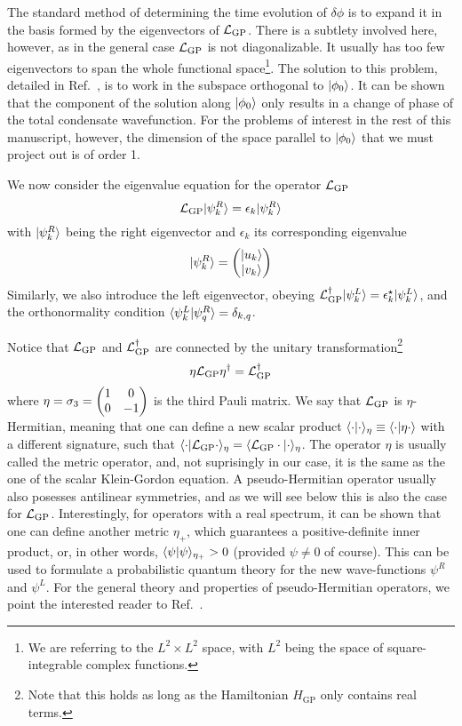 The standard method of determining the time evolution of $\delta\phi$
is to expand it in the basis formed by the eigenvectors of
$\mathcal{L}_{\text{GP}}$. There is a subtlety involved here, however, as in
the general case $\mathcal{L}_{\text{GP}}$ is not diagonalizable. It usually
has too few eigenvectors to span the whole functional
space\footnote{We are referring to the $L^2 \times L^2$ space, with
  $L^2$ being the space of square-integrable complex functions.}.
The solution to this problem, detailed in Ref.~\cite{Castin_1998},
is to work in the subspace orthogonal to $\vert \phi_0 \rangle$. It can be
shown that the component of the solution along $\vert \phi_0 \rangle$ only
results in a change of phase of the total condensate wavefunction. For
the problems of interest in the rest of this manuscript, however, the
dimension of the space parallel to $\vert \phi_0 \rangle$ that we must project
out is of order 1.

We now consider the eigenvalue equation for the operator $\mathcal{L}_{\text{GP}}$
%
\begin{equation}\label{eq:L-eigen}
  \mathcal{L}_{\text{GP}} \vert \psi_k^R \rangle = \epsilon_k \vert \psi_k^R \rangle
\end{equation}
% 
with $\vert \psi_k^R \rangle$ being the right eigenvector and $\epsilon_k$ its
corresponding eigenvalue
%
\begin{equation}\label{eq:psi-R}
  \vert \psi_k^R \rangle = \begin{pmatrix} \vert u_k \rangle\\ \vert v_k \rangle \end{pmatrix}
\end{equation}
% 
Similarly, we also introduce the left eigenvector, obeying
$\mathcal{L}_{\text{GP}}^{\dagger} \vert \psi_k^L \rangle = \epsilon_k^{\star} \vert \psi_k^L \rangle$,
and the orthonormality condition
$\langle \psi_k^L \vert \psi_q^R \rangle = \delta_{k,q}$. 

Notice that $\mathcal{L}_{\text{GP}}$ and $\mathcal{L}_{\text{GP}}^{\dagger}$ are
connected by the unitary transformation\footnote{Note that this holds
  as long as the Hamiltonian $H_{\text{GP}}$ only contains real
  terms.}
%
\begin{equation}\label{eq:symmetry-1}
  \eta \mathcal{L}_{\text{GP}} \eta^{\dagger} = \mathcal{L}_{\text{GP}}^{\dagger}
\end{equation}
% 
where $\eta = \sigma_3 = \begin{pmatrix} 1 & 0\\ 0 & -1 \end{pmatrix}$ is the third Pauli
matrix. We say that $\mathcal{L}_{\text{GP}}$ is $\eta$-Hermitian, meaning
that one can define a new scalar product
$\langle \cdot \vert \cdot \rangle_{\eta} \equiv \langle \cdot \vert \eta \cdot \rangle$ with a
different signature, such that
$\langle \cdot \vert \mathcal{L}_{\text{GP}} \cdot \rangle_{\eta} =
\langle \mathcal{L}_{\text{GP}} \cdot \vert \cdot \rangle_{\eta}$. The operator $\eta$ is
usually called the metric operator, and, not suprisingly in our case,
it is the same as the one of the scalar Klein-Gordon equation. A
pseudo-Hermitian operator usually also posesses antilinear symmetries,
and as we will see below this is also the case for
$\mathcal{L}_{\text{GP}}$. Interestingly, for operators with a real spectrum,
it can be shown that one can define another metric $\eta_+$, which
guarantees a positive-definite inner product, or, in other words,
$\langle \psi \vert \psi \rangle_{\eta_+} > 0$ (provided $\psi \neq 0$ of
course). This can be used to formulate a probabilistic quantum theory
for the new wave-functions $\psi^R$ and $\psi^L$. For the general
theory and properties of pseudo-Hermitian operators, we point the
interested reader to Ref.~\cite{MOSTAFAZADEH_2010}.


